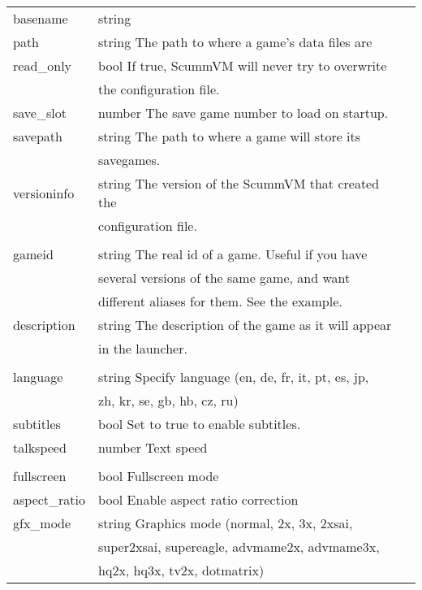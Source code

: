 \begin{tabular}[hf]{lll}
        basename       &string\\
        path           &string   The path to where a game's data files are\\
        read\_only     &bool     If true, ScummVM will never try to overwrite\\
                       &         the configuration file.\\
        save\_slot     &number   The save game number to load on startup.\\
        savepath       &string   The path to where a game will store its\\
                       &         savegames.\\
        versioninfo    &string   The version of the ScummVM that created the\\
                       &         configuration file.\\
\\
        gameid         &string   The real id of a game. Useful if you have\\
                       &         several versions of the same game, and want\\
                       &         different aliases for them. See the example.\\
        description    &string   The description of the game as it will appear\\
                       &         in the launcher.\\
\\
        language       &string   Specify language (en, de, fr, it, pt, es, jp,\\
                       &         zh, kr, se, gb, hb, cz, ru)\\
        subtitles      &bool     Set to true to enable subtitles.\\
        talkspeed      &number   Text speed\\
\\
        fullscreen     &bool     Fullscreen mode\\
        aspect\_ratio  &bool     Enable aspect ratio correction\\
        gfx\_mode      &string   Graphics mode (normal, 2x, 3x, 2xsai,\\
                       &         super2xsai, supereagle, advmame2x, advmame3x,\\
                       &         hq2x, hq3x, tv2x, dotmatrix)\\

\end{tabular}
